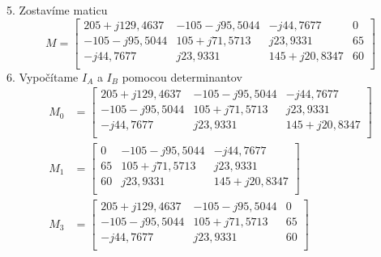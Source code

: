\documentclass[a4paper,12pt]{article}
\begin{document}
5. Zostavíme maticu
\begin{equation*}
M = \begin{bmatrix}
	205 +j129,4637 & -105-j95,5044 & -j44,7677 & 0  \\
	 -105 -j95,5044 & 105+j71,5713 &  j23,9331 & 65 \\
	-j44,7677 & j23,9331& 145+j20,8347 & 60 \\
     \end{bmatrix}
\end{equation*}
6. Vypočítame $I_A$ a $I_B$ pomocou determinantov
\begin{equation*}
\begin{split}
M_0 &= \begin{bmatrix}
	205 +j129,4637 & -105-j95,5044 & -j44,7677  \\
	 -105 -j95,5044 & 105+j71,5713 &  j23,9331\\
	-j44,7677 & j23,9331 & 145+j20,8347 \\
     \end{bmatrix} \\
M_1 &= \begin{bmatrix}
	0 & -105-j95,5044 & -j44,7677  \\
	65 & 105+j71,5713 &  j23,9331\\
	60 & j23,9331 & 145+j20,8347 \\
     \end{bmatrix} \\
M_3 &= \begin{bmatrix}
	205 +j129,4637 & -105-j95,5044 & 0 \\
	 -105 -j95,5044 & 105+j71,5713 &  65\\
	-j44,7677 & j23,9331 & 60 \\
     \end{bmatrix}
\end{split}
\end{equation*}
\end{document}
